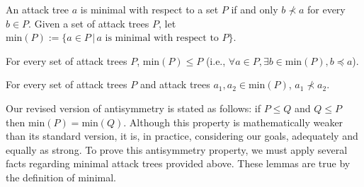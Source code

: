 \documentclass[runningheads]{llncs}
\theoremstyle{definition}
\begin{document}
\begin{definition}
  An attack tree $a$ is minimal with respect to a set $P$ if and only $b \nprec a$ for every $b \in P$. Given a set of attack trees $P$, let $\text{min}(P) := \{a \in P \,|\, a \text{ is minimal with respect to } P \}$.
\end{definition}

\begin{lemma}
  For every set of attack trees $P$, $\text{min}(P) \le P$ (i.e., $\forall a \in P, \exists b \in \text{min}(P), b \preceq a$).
\end{lemma}

\begin{lemma}
  For every set of attack trees $P$ and attack trees $a_1, a_2 \in \text{min}(P)$, $a_1 \nprec a_2$.
\end{lemma}

Our revised version of antisymmetry is stated as follows: if $P \le Q$ and $Q \le P$ then $\text{min}(P) = \text{min}(Q)$. Although this property is mathematically weaker than its standard version, it is, in practice, considering our goals, adequately and equally as strong. To prove this antisymmetry property, we must apply several facts regarding minimal attack trees provided above. These lemmas are true by the definition of minimal.
\end{document}

